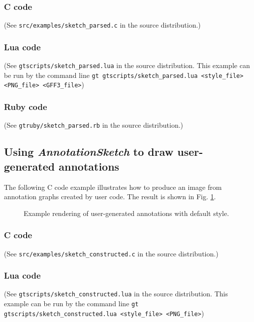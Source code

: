 \documentclass[a4paper]{scrreprt}
\begin{document}
\subsubsection{C code}
(See \texttt{src/examples/sketch\_parsed.c} in the source distribution.)

\subsubsection{Lua code}
(See \texttt{gtscripts/sketch\_parsed.lua} in the source distribution. This example can be run by the command line \texttt{gt gtscripts/sketch\_parsed.lua <style\_file> <PNG\_file> <GFF3\_file>})

\subsubsection{Ruby code}
(See \texttt{gtruby/sketch\_parsed.rb} in the source distribution.)


\subsection{Using \emph{AnnotationSketch} to draw user-generated annotations}
The following C code example illustrates how to produce an image from annotation graphs created by user code.
 The result is shown in Fig. \ref{constructed_img}.

\begin{figure}
\caption{Example rendering of user-generated annotations with default style.}
\label{constructed_img}
\end{figure}

\subsubsection{C code}
(See \texttt{src/examples/sketch\_constructed.c} in the source distribution.)

\subsubsection{Lua code}
(See \texttt{gtscripts/sketch\_constructed.lua} in the source distribution.  This example can be run by the command line \texttt{gt gtscripts/sketch\_constructed.lua <style\_file> <PNG\_file>})





\end{document}
